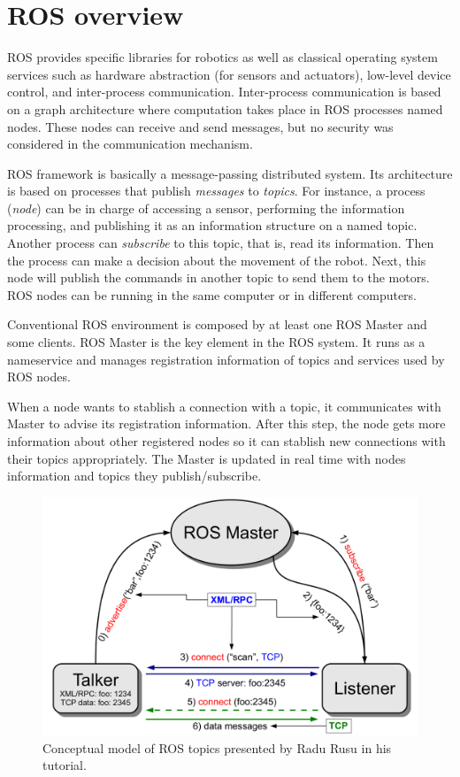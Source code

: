 \documentclass[journal,twoside]{JoPhA}
\begin{document}
\section{ROS overview}

ROS provides specific libraries for robotics as well as classical operating system services such as hardware abstraction (for sensors and actuators), low-level device control, and inter-process communication. Inter-process communication is based on a graph architecture where computation takes place in ROS processes named nodes. These nodes can receive and send messages, but no security was considered in the communication mechanism.

ROS framework is basically a message-passing distributed system. Its architecture is based on processes that publish {\em messages} to {\em topics}. For instance, a process ({\em node}) can be in charge of accessing a sensor, performing the information processing, and publishing it as an information structure on a named topic. Another process can {\em subscribe} to this topic, that is, read its information. Then the process can make a decision about the movement of the robot. Next, this node will publish the commands in another topic to send them to the motors. ROS nodes can be running in the same computer or in different computers.

Conventional ROS environment is composed by at least one ROS Master and some clients. ROS Master is the key element in the ROS system. It runs as a nameservice and manages registration information of topics and services used by ROS nodes. 

When a node wants to stablish a connection with a topic, it communicates with Master to advise its registration information. After this step, the node gets more information about other registered nodes so it can stablish new connections with their topics appropriately. The Master is updated in real time with nodes information and topics they publish/subscribe.

\begin{figure}[ht]
	\centering
	\includegraphics[width=.495\textwidth]{ros_tutorial.png}
	\caption{Conceptual model of ROS topics presented by Radu Rusu in his tutorial\cite{rusu2010ros}.}
	\label{fig:Conceptual_ROS_topics_model}
\end{figure}
\end{document}
